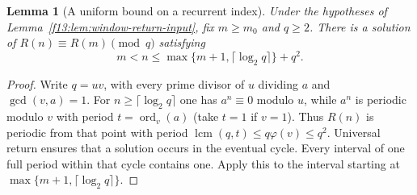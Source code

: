 \documentclass[11pt,a4paper]{article}
\newtheorem{lemma}[theorem]{Lemma}
\theoremstyle{definition}
\theoremstyle{remark}
\numberwithin{equation}{section}
\begin{document}
\begin{lemma}[A uniform bound on a recurrent index]
\label{f13:lem:window-return-bound}
Under the hypotheses of Lemma~\ref{f13:lem:window-return-input}, fix
$m\ge m_0$ and $q\ge2$.  There is a solution of
$R(n)\equiv R(m)\pmod q$ satisfying
\[
 m<n\le \max\{m+1,\lceil\log_2q\rceil\}+q^2.
\]
\end{lemma}
\begin{proof}
Write $q=uv$, with every prime divisor of $u$ dividing $a$ and
$\gcd(v,a)=1$.  For $n\ge\lceil\log_2q\rceil$ one has $a^n\equiv0$
modulo $u$, while $a^n$ is periodic modulo $v$ with period
$t=\operatorname{ord}_v(a)$ (take $t=1$ if $v=1$).  Thus $R(n)$ is
periodic from that point with period
$\operatorname{lcm}(q,t)\le q\varphi(v)\le q^2$.
Universal return ensures that a solution occurs in the eventual cycle.
Every interval of one full period within that cycle contains one.
Apply this to the interval starting at
$\max\{m+1,\lceil\log_2q\rceil\}$.
\end{proof}
\end{document}
